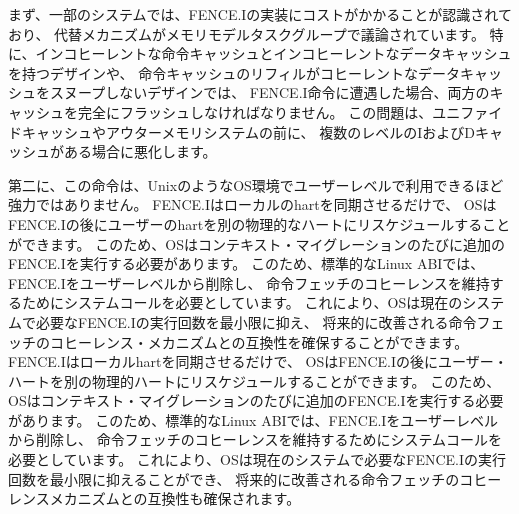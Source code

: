 \begin{commentary}
まず、一部のシステムでは、FENCE.Iの実装にコストがかかることが認識されており、
代替メカニズムがメモリモデルタスクグループで議論されています。 
特に、インコヒーレントな命令キャッシュとインコヒーレントなデータキャッシュを持つデザインや、
命令キャッシュのリフィルがコヒーレントなデータキャッシュをスヌープしないデザインでは、
FENCE.I命令に遭遇した場合、両方のキャッシュを完全にフラッシュしなければなりません。 
この問題は、ユニファイドキャッシュやアウターメモリシステムの前に、
複数のレベルのIおよびDキャッシュがある場合に悪化します。

\begin{comment}
Second, the instruction is not powerful enough to make available at
user level in a Unix-like operating system environment.  The FENCE.I
only synchronizes the local hart, and the OS can reschedule the user
hart to a different physical hart after the FENCE.I.  This would
require the OS to execute an additional FENCE.I as part of every
context migration.  For this reason, the standard Linux ABI has
removed FENCE.I from user-level and now requires a system call to
maintain instruction-fetch coherence, which allows the OS to minimize
the number of FENCE.I executions required on current systems and
provides forward-compatibility with future improved instruction-fetch
coherence mechanisms.
\end{comment}

第二に、この命令は、UnixのようなOS環境でユーザーレベルで利用できるほど強力ではありません。 
FENCE.Iはローカルのhartを同期させるだけで、
OSはFENCE.Iの後にユーザーのhartを別の物理的なハートにリスケジュールすることができます。
このため、OSはコンテキスト・マイグレーションのたびに追加のFENCE.Iを実行する必要があります。
このため、標準的なLinux ABIでは、FENCE.Iをユーザーレベルから削除し、
命令フェッチのコヒーレンスを維持するためにシステムコールを必要としています。
これにより、OSは現在のシステムで必要なFENCE.Iの実行回数を最小限に抑え、
将来的に改善される命令フェッチのコヒーレンス・メカニズムとの互換性を確保することができます。 
FENCE.Iはローカルhartを同期させるだけで、
OSはFENCE.Iの後にユーザー・ハートを別の物理的ハートにリスケジュールすることができます。
このため、OSはコンテキスト・マイグレーションのたびに追加のFENCE.Iを実行する必要があります。
このため、標準的なLinux ABIでは、FENCE.Iをユーザーレベルから削除し、
命令フェッチのコヒーレンスを維持するためにシステムコールを必要としています。
これにより、OSは現在のシステムで必要なFENCE.Iの実行回数を最小限に抑えることができ、
将来的に改善される命令フェッチのコヒーレンスメカニズムとの互換性も確保されます。


\end{commentary}

